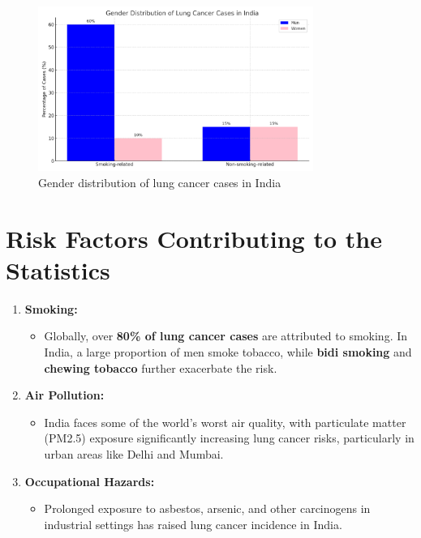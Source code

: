 \begin{figure}[h!]
    \centering
    \includegraphics[width=0.8\textwidth]{images/lung_cancer_gender_distribution_chart.png}
    \caption{Gender distribution of lung cancer cases in India}
    \label{fig:gender_distribution}
\end{figure}

\section{Risk Factors Contributing to the Statistics}
\begin{enumerate}
    \item \textbf{Smoking:}
    \begin{itemize}
        \item Globally, over \textbf{80\% of lung cancer cases} are attributed to smoking. In India, a large proportion of men smoke tobacco, while \textbf{bidi smoking} and \textbf{chewing tobacco} further exacerbate the risk.
    \end{itemize}
    \item \textbf{Air Pollution:}
    \begin{itemize}
        \item India faces some of the world's worst air quality, with particulate matter (PM2.5) exposure significantly increasing lung cancer risks, particularly in urban areas like Delhi and Mumbai.
    \end{itemize}
    \item \textbf{Occupational Hazards:}
    \begin{itemize}
        \item Prolonged exposure to asbestos, arsenic, and other carcinogens in industrial settings has raised lung cancer incidence in India.
    \end{itemize}
\end{enumerate}

